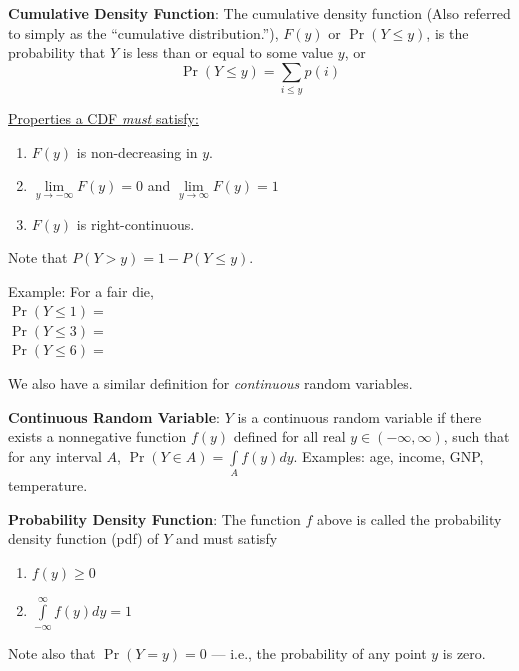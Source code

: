 \documentclass[]{book}
\providecommand{\tightlist}{%
  \setlength{\itemsep}{0pt}\setlength{\parskip}{0pt}}
\theoremstyle{definition}
\theoremstyle{definition}
\theoremstyle{definition}
\theoremstyle{remark}
\begin{document}

\textbf{Cumulative Density Function}: The cumulative density function
(Also referred to simply as the ``cumulative distribution.''), \(F(y)\)
or \(\Pr(Y\le y)\), is the probability that \(Y\) is less than or equal
to some value \(y\), or \[\Pr(Y\le y)=\sum\limits_{i\le y} p(i)\]

\underline{Properties a CDF \textit{must} satisfy:}

\begin{enumerate}
\def\labelenumi{\arabic{enumi}.}
\tightlist
\item
  \(F(y)\) is non-decreasing in \(y\).
\item
  \(\lim\limits_{y \to -\infty} F(y) = 0\) and
  \(\lim\limits_{y \to \infty} F(y) = 1\)
\item
  \(F(y)\) is right-continuous.
\end{enumerate}

Note that \(P(Y > y) = 1 - P(Y \le y)\).

\begin{framed}
\parbox[c]{4.55in}{Example:  For a fair die,\\ $\Pr(Y\le 1)=$\\ $\Pr(Y\le 3)=$\\ $\Pr(Y\le 6)=$} %
\end{framed}

We also have a similar definition for \emph{continuous} random
variables.

\textbf{Continuous Random Variable}: \(Y\) is a continuous random
variable if there exists a nonnegative function \(f(y)\) defined for all
real \(y\in (-\infty,\infty)\), such that for any interval \(A\),
\(\Pr(Y\in A)=\int\limits_A f(y)dy\). Examples: age, income, GNP,
temperature.

\textbf{Probability Density Function}: The function \(f\) above is
called the probability density function (pdf) of \(Y\) and must satisfy

\begin{enumerate}
  \item $f(y)\ge 0$
  \item $\int\limits_{-\infty}^\infty f(y)dy=1$
  \end{enumerate}

Note also that \(\Pr(Y=y)=0\) --- i.e., the probability of any point
\(y\) is zero.
\end{document}
